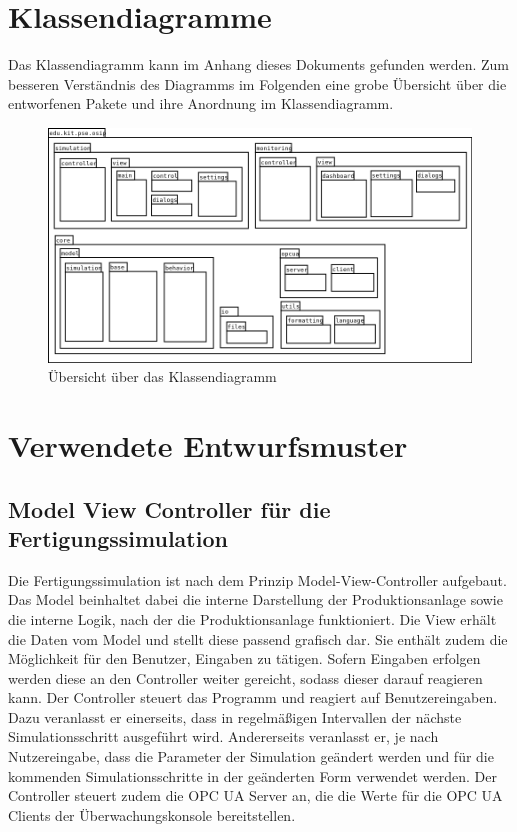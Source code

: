 \documentclass[parskip=full]{scrartcl}
\begin{document}
\section{Klassendiagramme}
Das Klassendiagramm kann im Anhang dieses Dokuments gefunden werden. Zum besseren Verständnis des Diagramms im Folgenden
eine grobe Übersicht über die entworfenen Pakete und ihre Anordnung im Klassendiagramm.

\begin{figure}[H]
  \centering
  \includegraphics[scale=0.45]{design/class-diagram-map.png}
  \caption{Übersicht über das Klassendiagramm}
\end{figure}

\pagebreak
\section{Verwendete Entwurfsmuster}
\subsection{Model View Controller f\"ur die Fertigungssimulation}
Die Fertigungssimulation ist nach dem Prinzip Model-View-Controller aufgebaut.
Das Model beinhaltet dabei die interne Darstellung der Produktionsanlage sowie die interne Logik, nach der die Produktionsanlage funktioniert. 
Die View erh\"alt die Daten vom Model und stellt diese passend grafisch dar. Sie enth\"alt zudem die M\"oglichkeit f\"ur den Benutzer, Eingaben zu
t\"atigen. Sofern Eingaben erfolgen werden diese an den Controller weiter gereicht, sodass dieser darauf reagieren kann.
Der Controller steuert das Programm und reagiert auf Benutzereingaben. Dazu veranlasst er einerseits, dass in regelm\"a{\ss}igen Intervallen der
n\"achste Simulationsschritt ausgef\"uhrt wird. Andererseits veranlasst er, je nach Nutzereingabe, dass die Parameter der Simulation ge\"andert werden
und f\"ur die kommenden Simulationsschritte in der ge\"anderten Form verwendet werden. Der Controller steuert zudem die OPC UA Server an, die die
Werte f\"ur die OPC UA Clients der \"Uberwachungskonsole bereitstellen.
\end{document}
